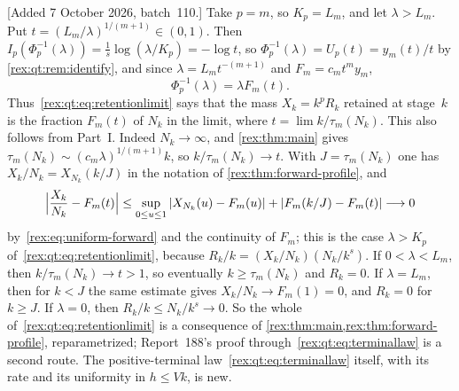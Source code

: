 \begin{remark}\label{rex:qt:rem:retention}
[Added 7 October 2026, batch~110.] Take $p=m$, so $K_p=L_m$, and let
$\lambda>L_m$. Put $t=(L_m/\lambda)^{1/(m+1)}\in(0,1)$. Then
$I_p(\Phi_p^{-1}(\lambda))=\frac1s\log(\lambda/K_p)=-\log t$, so
$\Phi_p^{-1}(\lambda)=U_p(t)=y_m(t)/t$ by \cref{rex:qt:rem:identify}, and since
$\lambda=L_mt^{-(m+1)}$ and $F_m=c_mt^my_m$,
\[
 \Phi_p^{-1}(\lambda)=\lambda F_m(t).
\]
Thus~\eqref{rex:qt:eq:retentionlimit} says that the mass $X_k=k^pR_k$ retained
at stage~$k$ is the fraction $F_m(t)$ of $N_k$ in the limit, where
$t=\lim k/\tau_m(N_k)$. This also follows from Part~I. Indeed $N_k\to\infty$,
and \cref{rex:thm:main} gives $\tau_m(N_k)\sim(c_m\lambda)^{1/(m+1)}k$, so
$k/\tau_m(N_k)\to t$. With $J=\tau_m(N_k)$ one has
$X_k/N_k=X_{N_k}(k/J)$ in the notation of \cref{rex:thm:forward-profile}, and
\[
 \Bigl|\frac{X_k}{N_k}-F_m(t)\Bigr|
 \le\sup_{0\le u\le1}|X_{N_k}(u)-F_m(u)|+|F_m(k/J)-F_m(t)|\longrightarrow0
\]
by~\eqref{rex:eq:uniform-forward} and the continuity of $F_m$; this is the
case $\lambda>K_p$ of~\eqref{rex:qt:eq:retentionlimit}, because
$R_k/k=(X_k/N_k)(N_k/k^s)$. If $0<\lambda<L_m$, then $k/\tau_m(N_k)\to t>1$, so
eventually $k\ge\tau_m(N_k)$ and $R_k=0$. If $\lambda=L_m$, then for $k<J$ the
same estimate gives $X_k/N_k\to F_m(1)=0$, and $R_k=0$ for $k\ge J$. If
$\lambda=0$, then $R_k/k\le N_k/k^s\to0$. So the whole
of~\eqref{rex:qt:eq:retentionlimit} is a consequence of
\cref{rex:thm:main,rex:thm:forward-profile}, reparametrized; Report~188's proof
through~\eqref{rex:qt:eq:terminallaw} is a second route. The positive-terminal
law~\eqref{rex:qt:eq:terminallaw} itself, with its rate and its uniformity in
$h\le Vk$, is new.
\end{remark}

